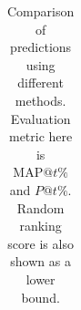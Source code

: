 \documentclass[10pt,twocolumn,letterpaper]{article}
\begin{document}
\begin{table}[]
\begin{center}
{\begin{tabular}{c|cccccc|cccccc}
\end{tabular}
}
\end{center}
\caption{Comparison of predictions using different methods. Evaluation metric here is $\text{MAP}@t\%$ and $P@t\%$. Random ranking score is also shown as a lower bound.}

\label{aesthetic_table}
\end{table}
\end{document}
